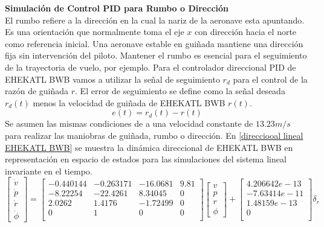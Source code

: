 \bigskip

\textbf{Simulación de Control PID para Rumbo o Dirección}\\
El rumbo refiere a la dirección en la cual la nariz de la aeronave esta apuntando. 
Es una orientación que normalmente toma el eje $x$ con dirección hacia el norte como referencia inicial. 
Una aeronave estable en guiñada mantiene una dirección fija sin intervención del piloto. 
Mantener el rumbo es esencial para el seguimiento de la trayectoria de vuelo, por ejemplo.
Para el controlador direccional PID de EHEKATL BWB vamos a utilizar la señal de seguimiento $r_d$ para el control de la razón de guiñada $r$. 
El error de seguimiento se define como la señal deseada  $r_d(t)$ menos la velocidad de guiñada de EHEKATL BWB $r(t)$. 
\begin{equation}
    e(t) = r_d (t) - r(t)
\end{equation}
Se asumen las mismas condiciones de a una velocidad constante de $13.23 m/s$ para realizar las maniobras de guiñada, rumbo o dirección. 
En \ref{direcciooal lineal EHEKATL BWB} se muestra la dinámica direccional de EHEKATL BWB en representación en espacio de estados para las simulaciones del sistema lineal invariante en el tiempo. 
\begin{equation}
\label{direcciooal lineal EHEKATL BWB}
    \begin{bmatrix}
        \dot v \\
        \dot p \\
        \dot r \\
        \dot \phi
    \end{bmatrix}
    =
    \begin{bmatrix}
    -0.440144 & -0.263171 & -16.0681 & 9.81 \\
    -8.22254 & -22.4261 & 8.34045 & 0 \\
    2.0262 & 1.4176 &-1.72499 & 0 \\
    0 & 1 & 0 & 0 \\
    \end{bmatrix}
    \begin{bmatrix}
        v \\
        p \\
        r \\
        \phi
    \end{bmatrix}
    +
    \begin{bmatrix}
    4.206642e-13 \\
    -7.63414e-11 \\
    1.48159e-13 \\
    0 \\
    \end{bmatrix}
    \delta_r
\end{equation}

